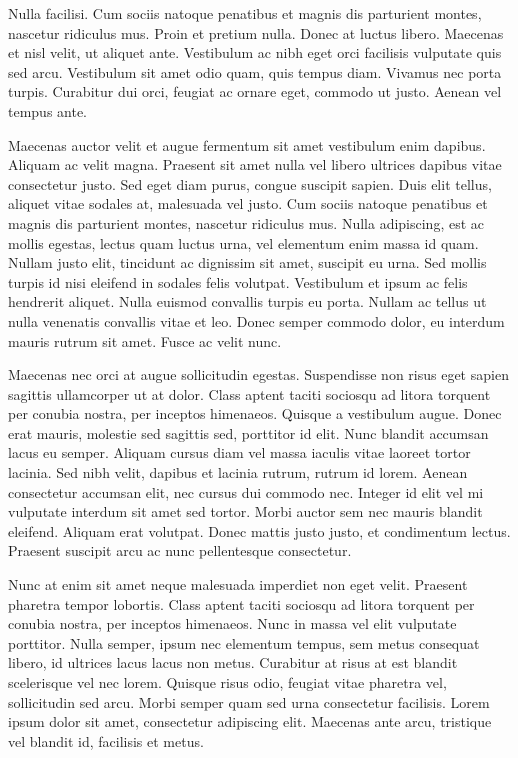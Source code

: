 Nulla facilisi. Cum sociis natoque penatibus et magnis dis parturient
montes, nascetur ridiculus mus. Proin et pretium nulla. Donec at luctus
libero. Maecenas et nisl velit, ut aliquet ante. Vestibulum ac nibh
eget orci facilisis vulputate quis sed arcu. Vestibulum sit amet odio
quam, quis tempus diam. Vivamus nec porta turpis. Curabitur dui orci,
feugiat ac ornare eget, commodo ut justo. Aenean vel tempus ante.

Maecenas auctor velit et augue fermentum sit amet vestibulum enim
dapibus. Aliquam ac velit magna. Praesent sit amet nulla vel libero
ultrices dapibus vitae consectetur justo. Sed eget diam purus, congue
suscipit sapien. Duis elit tellus, aliquet vitae sodales at, malesuada
vel justo. Cum sociis natoque penatibus et magnis dis parturient montes,
nascetur ridiculus mus. Nulla adipiscing, est ac mollis egestas, lectus
quam luctus urna, vel elementum enim massa id quam. Nullam justo elit,
tincidunt ac dignissim sit amet, suscipit eu urna. Sed mollis turpis
id nisi eleifend in sodales felis volutpat. Vestibulum et ipsum ac
felis hendrerit aliquet. Nulla euismod convallis turpis eu porta.
Nullam ac tellus ut nulla venenatis convallis vitae et leo. Donec
semper commodo dolor, eu interdum mauris rutrum sit amet. Fusce ac
velit nunc.

Maecenas nec orci at augue sollicitudin egestas. Suspendisse non risus
eget sapien sagittis ullamcorper ut at dolor. Class aptent taciti
sociosqu ad litora torquent per conubia nostra, per inceptos himenaeos.
Quisque a vestibulum augue. Donec erat mauris, molestie sed sagittis
sed, porttitor id elit. Nunc blandit accumsan lacus eu semper. Aliquam
cursus diam vel massa iaculis vitae laoreet tortor lacinia. Sed nibh
velit, dapibus et lacinia rutrum, rutrum id lorem. Aenean consectetur
accumsan elit, nec cursus dui commodo nec. Integer id elit vel mi
vulputate interdum sit amet sed tortor. Morbi auctor sem nec mauris
blandit eleifend. Aliquam erat volutpat. Donec mattis justo justo,
et condimentum lectus. Praesent suscipit arcu ac nunc pellentesque
consectetur.

Nunc at enim sit amet neque malesuada imperdiet non eget velit. Praesent
pharetra tempor lobortis. Class aptent taciti sociosqu ad litora torquent
per conubia nostra, per inceptos himenaeos. Nunc in massa vel elit
vulputate porttitor. Nulla semper, ipsum nec elementum tempus, sem
metus consequat libero, id ultrices lacus lacus non metus. Curabitur
at risus at est blandit scelerisque vel nec lorem. Quisque risus odio,
feugiat vitae pharetra vel, sollicitudin sed arcu. Morbi semper quam
sed urna consectetur facilisis. Lorem ipsum dolor sit amet, consectetur
adipiscing elit. Maecenas ante arcu, tristique vel blandit id, facilisis
et metus.

